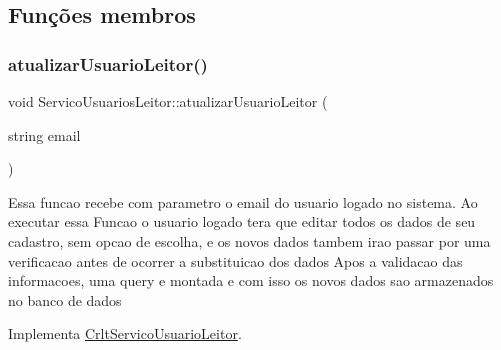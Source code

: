 \subsection{Funções membros}
\mbox{\label{class_servico_usuarios_leitor_ad77426aecdda591b99ecbf8259a05b2d}} 
\subsubsection{\texorpdfstring{atualizar\+Usuario\+Leitor()}{atualizarUsuarioLeitor()}}
{\footnotesize\ttfamily void Servico\+Usuarios\+Leitor\+::atualizar\+Usuario\+Leitor (\begin{DoxyParamCaption}\item[{string}]{email }\end{DoxyParamCaption})\hspace{0.3cm}{\ttfamily [virtual]}}

Essa funcao recebe com parametro o email do usuario logado no sistema. Ao executar essa Funcao o usuario logado tera que editar todos os dados de seu cadastro, sem opcao de escolha, e os novos dados tambem irao passar por uma verificacao antes de ocorrer a substituicao dos dados Apos a validacao das informacoes, uma query e montada e com isso os novos dados sao armazenados no banco de dados

Implementa \mbox{\hyperlink{class_crlt_servico_usuario_leitor_a075822102b4f3cbf1805507d8b78fde8}{Crlt\+Servico\+Usuario\+Leitor}}.


